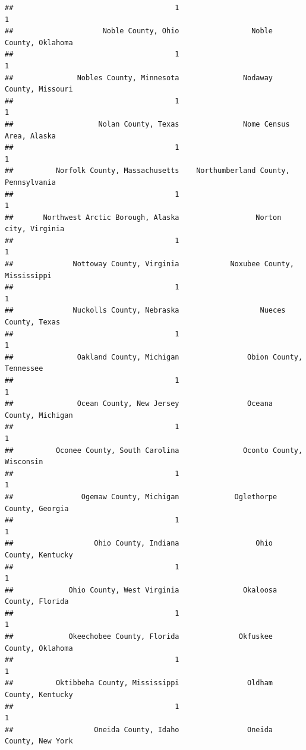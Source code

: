 \documentclass[
]{article}
\begin{document}
\begin{verbatim}
##                                      1                                      1 
##                     Noble County, Ohio                 Noble County, Oklahoma 
##                                      1                                      1 
##               Nobles County, Minnesota               Nodaway County, Missouri 
##                                      1                                      1 
##                    Nolan County, Texas               Nome Census Area, Alaska 
##                                      1                                      1 
##          Norfolk County, Massachusetts    Northumberland County, Pennsylvania 
##                                      1                                      1 
##       Northwest Arctic Borough, Alaska                  Norton city, Virginia 
##                                      1                                      1 
##              Nottoway County, Virginia            Noxubee County, Mississippi 
##                                      1                                      1 
##              Nuckolls County, Nebraska                   Nueces County, Texas 
##                                      1                                      1 
##               Oakland County, Michigan                Obion County, Tennessee 
##                                      1                                      1 
##               Ocean County, New Jersey                Oceana County, Michigan 
##                                      1                                      1 
##          Oconee County, South Carolina               Oconto County, Wisconsin 
##                                      1                                      1 
##                Ogemaw County, Michigan             Oglethorpe County, Georgia 
##                                      1                                      1 
##                   Ohio County, Indiana                  Ohio County, Kentucky 
##                                      1                                      1 
##             Ohio County, West Virginia               Okaloosa County, Florida 
##                                      1                                      1 
##             Okeechobee County, Florida              Okfuskee County, Oklahoma 
##                                      1                                      1 
##          Oktibbeha County, Mississippi                Oldham County, Kentucky 
##                                      1                                      1 
##                   Oneida County, Idaho                Oneida County, New York 

\end{verbatim}
\end{document}
